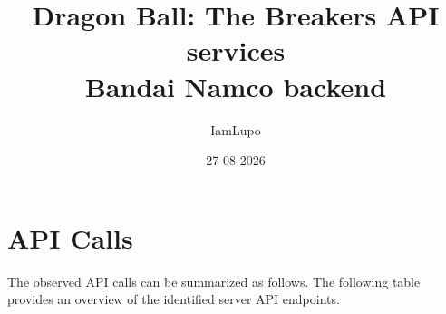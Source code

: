 \documentclass[11pt,a4paper]{article}
\title{
    Dragon Ball: The Breakers API services\\
    \large Bandai Namco backend
}
\author{IamLupo}
\date{27-08-2026}
\begin{document}


\tableofcontents
\newpage










\section{API Calls}

The observed API calls can be summarized as follows. The following table provides an overview of the
identified server API endpoints.









































\end{document}
